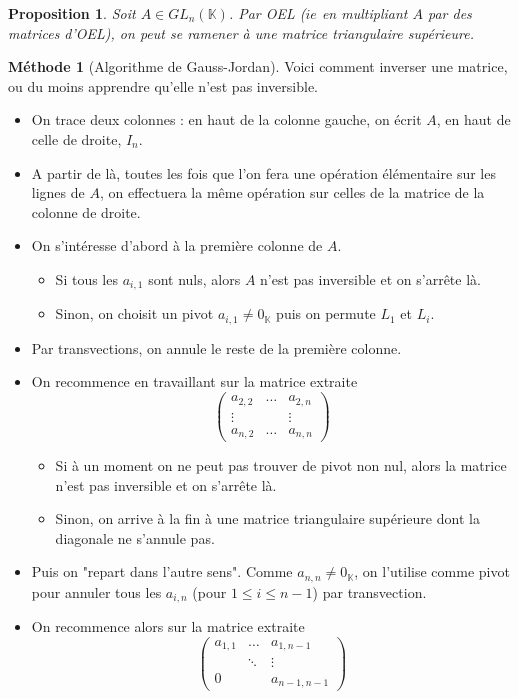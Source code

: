 \documentclass[french]{book}
\newcommand{\K}{\mathbb{K}}
\theoremstyle{plain}
\newtheorem{prop}{Proposition}[chapter]
\theoremstyle{definition}
\newtheorem{met}{Méthode}[chapter]
\theoremstyle{remark}
\begin{document}
\begin{prop}
	Soit $A\in GL_n(\K)$. Par OEL ($ie$ en multipliant $A$ par des matrices d'OEL), on peut se ramener à une matrice triangulaire supérieure.
\end{prop}
\begin{met}[Algorithme de Gauss-Jordan]
	Voici comment inverser une matrice, ou du moins apprendre qu'elle n'est pas inversible.
	\begin{itemize}
		\item On trace deux colonnes : en haut de la colonne gauche, on écrit $A$, en haut de celle de droite, $I_n$.
		\item A partir de là, toutes les fois que l'on fera une opération élémentaire sur les lignes de $A$, on effectuera la même opération sur celles de la matrice de la colonne de droite.
		\item On s'intéresse d'abord à la première colonne de $A$.
		\begin{itemize}
			\item Si tous les $a_{i,1}$ sont nuls, alors $A$ n'est pas inversible et on s'arrête là.
			\item Sinon, on choisit un pivot $a_{i,1}\ne0_\K$ puis on permute $L_1$ et $L_i$.
		\end{itemize}
		\item Par transvections, on annule le reste de la première colonne. 
		\item On recommence en travaillant sur la matrice extraite $$\begin{pmatrix}a_{2,2}&\ldots&a_{2,n}\\ \vdots&&\vdots\\ a_{n,2}&\ldots&a_{n,n}\end{pmatrix}$$
		\begin{itemize}
			\item[--] Si à un moment on ne peut pas trouver de pivot non nul, alors la matrice n'est pas inversible et on s'arrête là.
			\item[--] Sinon, on arrive à la fin à une matrice triangulaire supérieure dont la diagonale ne s'annule pas.
		\end{itemize}
		\item Puis on "repart dans l'autre sens". Comme $a_{n,n}\ne0_\K$, on l'utilise comme pivot pour annuler tous les $a_{i,n}$ (pour $1\leqslant i\leqslant n-1$) par transvection.
		\item On recommence alors sur la matrice extraite $$\begin{pmatrix}
			a_{1,1}&\ldots&a_{1,n-1}\\ &\ddots&\vdots\\0&&a_{n-1,n-1}

\end{pmatrix}$$
\end{itemize}
\end{met}
\end{document}
